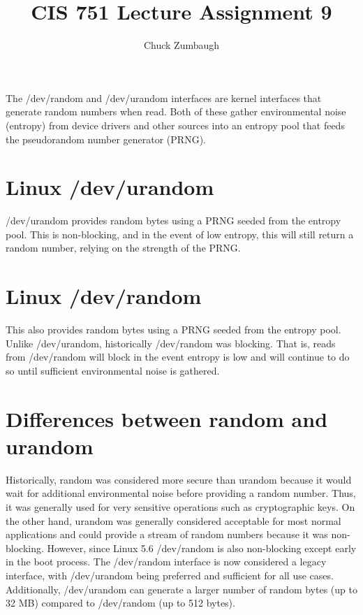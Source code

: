 \documentclass[12pt]{article}
\title{CIS 751 Lecture Assignment 9}
\author{Chuck Zumbaugh}
\begin{document}
\maketitle

The /dev/random and /dev/urandom interfaces are kernel interfaces that generate random numbers when read. Both of these gather environmental noise (entropy) from device drivers and other sources into an entropy pool that feeds the pseudorandom number generator (PRNG).

\section{Linux /dev/urandom}
/dev/urandom provides random bytes using a PRNG seeded from the entropy pool. This is non-blocking, and in the event of low entropy, this will still return a random number, relying on the strength of the PRNG.

\section{Linux /dev/random}
This also provides random bytes using a PRNG seeded from the entropy pool. Unlike /dev/urandom, historically /dev/random was blocking. That is, reads from /dev/random will block in the event entropy is low and will continue to do so until sufficient environmental noise is gathered.

\section{Differences between random and urandom}
Historically, random was considered more secure than urandom because it would wait for additional environmental noise before providing a random number. Thus, it was generally used for very sensitive operations such as cryptographic keys. On the other hand, urandom was generally considered acceptable for most normal applications and could provide a stream of random numbers because it was non-blocking. However, since Linux 5.6 /dev/random is also non-blocking except early in the boot process. The /dev/random interface is now considered a legacy interface, with /dev/urandom being preferred and sufficient for all use cases. Additionally, /dev/urandom can generate a larger number of random bytes (up to 32 MB) compared to /dev/random (up to 512 bytes).
\end{document}
